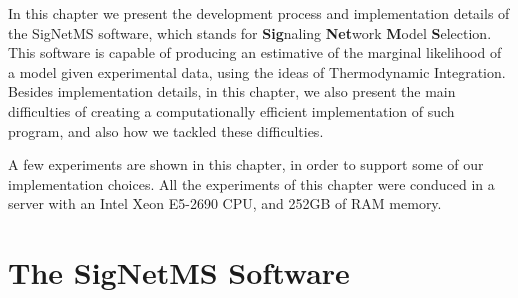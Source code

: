 In this chapter we present the development process and implementation
details of the SigNetMS software, which stands for {\bf Sig}naling 
{\bf Net}work {\bf M}odel {\bf S}election. This software is capable of
producing an estimative of the marginal likelihood of a model given
experimental data, using the ideas of Thermodynamic Integration. Besides
implementation details, in this chapter, we also present the main 
difficulties of creating a computationally efficient implementation of
such program, and also how we tackled these difficulties. 

A few experiments are shown in this chapter, in order to support some of
our implementation choices. All the experiments of this chapter were
conduced in a server with an Intel Xeon E5-2690 CPU, and 252GB of RAM
memory.


\section{The SigNetMS Software}



